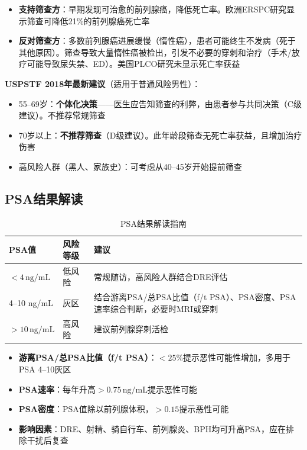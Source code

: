 \documentclass[12pt,a4paper,twoside]{ctexbook}
\begin{document}
\begin{itemize}[leftmargin=2cm]
	\item \textbf{支持筛查方}：早期发现可治愈的前列腺癌，降低死亡率。欧洲ERSPC研究显示筛查可降低21\%的前列腺癌死亡率
	\item \textbf{反对筛查方}：多数前列腺癌进展缓慢（惰性癌），患者可能终生不发病（死于其他原因）。筛查导致大量惰性癌被检出，引发不必要的穿刺和治疗（手术/放疗可能导致尿失禁、ED）。美国PLCO研究未显示死亡率获益
\end{itemize}

\textbf{USPSTF 2018年最新建议}（适用于普通风险男性）：
\begin{itemize}[leftmargin=2cm]
	\item 55--69岁：\textbf{个体化决策}——医生应告知筛查的利弊，由患者参与共同决策（C级建议）。不推荐常规筛查
	\item 70岁以上：\textbf{不推荐筛查}（D级建议）。此年龄段筛查无死亡率获益，且增加治疗伤害
	\item 高风险人群（黑人、家族史）：可考虑从40--45岁开始提前筛查
\end{itemize}

\subsection{PSA结果解读}

\begin{table}[htbp]
\centering
\caption{PSA结果解读指南}
\label{tab:psa_interpretation}
\begin{tabularx}{\textwidth}{@{}llX@{}}
    \toprule
    \textbf{PSA值} & \textbf{风险等级} & \textbf{建议} \\
    \midrule
    $<4\,\mathrm{ng/mL}$ & 低风险 & 常规随访，高风险人群结合DRE评估 \\
    4--10 ng/mL & 灰区 & 结合游离PSA/总PSA比值（f/t PSA）、PSA密度、PSA速率综合判断，必要时MRI或穿刺 \\
    $>10\,\mathrm{ng/mL}$ & 高风险 & 建议前列腺穿刺活检 \\
    \bottomrule
\end{tabularx}
\end{table}

\begin{itemize}[leftmargin=2cm]
	\item \textbf{游离PSA/总PSA比值（f/t PSA）}：$<25\%$提示恶性可能性增加，多用于PSA 4--10灰区
	\item \textbf{PSA速率}：每年升高$>0.75\,\mathrm{ng/mL}$提示恶性可能
	\item \textbf{PSA密度}：PSA值除以前列腺体积，$>0.15$提示恶性可能
	\item \textbf{影响因素}：DRE、射精、骑自行车、前列腺炎、BPH均可升高PSA，应在排除干扰后复查
\end{itemize}
\end{document}
